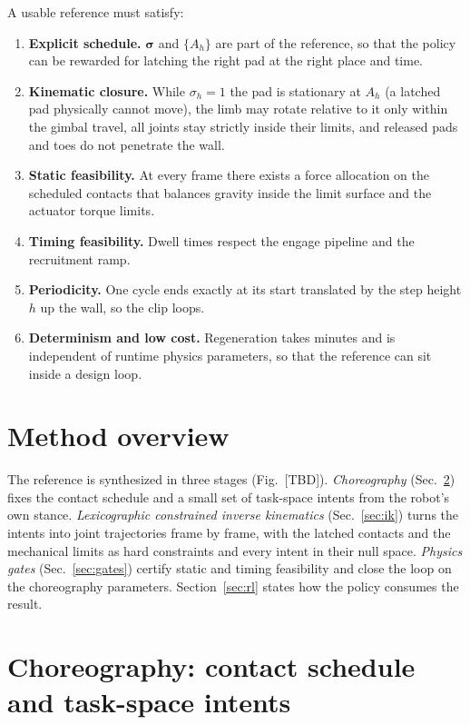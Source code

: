 \documentclass[11pt]{article}
\newcommand{\tbd}{{\color{red}[TBD]}}
\begin{document}
A usable reference must satisfy:
\begin{enumerate}[label=(R\arabic*),leftmargin=2.6em]
  \item \textbf{Explicit schedule.} $\bm\sigma$ and $\{A_h\}$ are part of the
        reference, so that the policy can be rewarded for latching the
        right pad at the right place and time.
  \item \textbf{Kinematic closure.} While $\sigma_h=1$ the pad is
        stationary at $A_h$ (a latched pad physically cannot move), the
        limb may rotate relative to it only within the gimbal travel, all
        joints stay strictly inside their limits, and released pads and toes
        do not penetrate the wall.
  \item \textbf{Static feasibility.} At every frame there exists a force
        allocation on the scheduled contacts that balances gravity inside
        the limit surface and the actuator torque limits.
  \item \textbf{Timing feasibility.} Dwell times respect the engage pipeline
        and the recruitment ramp.
  \item \textbf{Periodicity.} One cycle ends exactly at its start
        translated by the step height $h$ up the wall, so the clip loops.
  \item \textbf{Determinism and low cost.} Regeneration takes minutes and
        is independent of runtime physics parameters, so that the reference
        can sit inside a design loop.
\end{enumerate}

\section{Method overview}

The reference is synthesized in three stages (Fig.~\tbd).
\emph{Choreography} (Sec.~\ref{sec:choreo}) fixes the contact schedule and a
small set of task-space intents from the robot's own stance.
\emph{Lexicographic constrained inverse kinematics}
(Sec.~\ref{sec:ik}) turns the intents into joint trajectories frame by
frame, with the latched contacts and the mechanical limits as hard
constraints and every intent in their null space. \emph{Physics gates}
(Sec.~\ref{sec:gates}) certify static and timing feasibility and close the
loop on the choreography parameters. Section~\ref{sec:rl} states how the
policy consumes the result.

\section{Choreography: contact schedule and task-space intents}
\label{sec:choreo}
\end{document}
